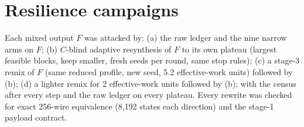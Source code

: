 \documentclass[11pt,a4paper]{article}
\begin{document}
\section{Resilience campaigns}
Each mixed output $F$ was attacked by: (a) the raw ledger and the nine narrow arms on $F$; (b) $C$-blind adaptive resynthesis of $F$ to its own plateau (largest feasible blocks, keep smaller, fresh seeds per round, same stop rules); (c) a stage-3 remix of $F$ (same reduced profile, new seed, 5.2 effective-work units) followed by (b); (d) a lighter remix for 2 effective-work units followed by (b); with the census after every step and the raw ledger on every plateau. Every rewrite was checked for exact 256-wire equivalence (8{,}192 states each direction) and the stage-1 payload contract.
\begin{table}[H]\centering\scriptsize
{}
\caption{Resilience of the mixed outputs. r = rounds to plateau, g = gates at plateau, then deeper affine births exposed at the plateau and the repeated deeper values of its raw ledger.}
\end{table}
\end{document}
